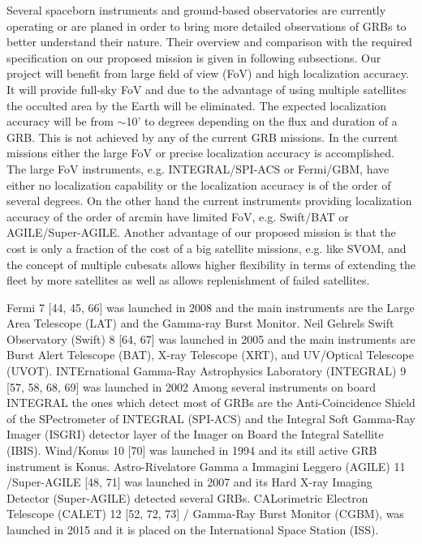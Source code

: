 \documentclass[12pt, a4paper,titlepage]{article}
\numberwithin{equation}{section}
\numberwithin{figure}{section}
\begin{document}
Several spaceborn instruments and ground-based observatories are currently operating or are planed in
order to bring more detailed observations of GRBs to better understand their nature. Their overview
and comparison with the required specification on our proposed mission is given in following
subsections.
Our project will benefit from large field of view (FoV) and high localization accuracy. It will provide
full-sky FoV and due to the advantage of using multiple satellites the occulted area by the Earth will
be eliminated. The expected localization accuracy will be from $\sim$10' to degrees depending on the flux and duration of a GRB. This is not achieved by any of the current GRB missions. In the current missions either the large FoV or precise localization accuracy is accomplished. The large FoV instruments, e.g. INTEGRAL/SPI-ACS or Fermi/GBM, have either no localization capability or the localization accuracy is of the order of several degrees. On the other hand the current instruments providing localization accuracy of the order of arcmin have limited FoV, e.g. Swift/BAT or
AGILE/Super-AGILE.
Another advantage of our proposed mission is that the cost is only a fraction of the cost of a big
satellite missions, e.g. like SVOM, and the concept of multiple cubesats allows higher flexibility in
terms of extending the fleet by more satellites as well as allows replenishment of failed satellites.

Fermi 7 [44, 45, 66] was launched in 2008 and the main instruments are the Large Area Telescope (LAT) and the Gamma-ray Burst Monitor. 
Neil Gehrels Swift Observatory (Swift) 8 [64, 67] was launched in 2005 and the main instruments are
Burst Alert Telescope (BAT), X-ray Telescope (XRT), and UV/Optical Telescope (UVOT).
INTErnational Gamma-Ray Astrophysics Laboratory (INTEGRAL) 9 [57, 58, 68, 69] was launched in
2002 Among several instruments on board INTEGRAL the ones which detect most of GRBs are the Anti-Coincidence Shield of the SPectrometer of INTEGRAL (SPI-ACS) and the Integral Soft Gamma-Ray Imager (ISGRI) detector layer of the Imager on Board the Integral Satellite (IBIS).
Wind/Konus 10 [70] was launched in 1994 and its still active GRB instrument is Konus.
Astro-Rivelatore Gamma a Immagini Leggero (AGILE) 11 /Super-AGILE [48, 71] was launched in
2007 and its Hard X-ray Imaging Detector (Super-AGILE) detected several GRBs.
CALorimetric Electron Telescope (CALET) 12 [52, 72, 73] / Gamma-Ray Burst Monitor (CGBM), was launched in 2015 and it is placed on the International Space Station (ISS).
\end{document}
